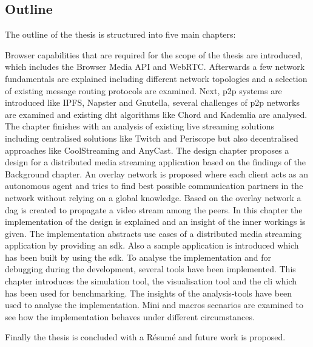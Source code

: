 \subsection{Outline}
The outline of the thesis is structured into five main chapters:
\begin{itemize}
     Browser capabilities that are required for the scope of the thesis are introduced, which includes the Browser Media API and WebRTC. Afterwards a few network fundamentals are explained including different network topologies and a selection of existing message routing protocols are examined. Next, \gls{p2p} systems are introduced like IPFS, Napster and Gnutella, several challenges of \gls{p2p} networks are examined and existing \gls{dht} algorithms like Chord and Kademlia are analysed. The chapter finishes with an analysis of existing live streaming solutions including centralised solutions like Twitch and Periscope but also decentralised approaches like CoolStreaming and AnyCast.   
     The design chapter proposes a design for a distributed media streaming application based on the findings of the Background chapter. An overlay network is proposed where each client acts as an autonomous agent and tries to find best possible communication partners in the network without relying on a global knowledge. Based on the overlay network a \gls{dag} is created to propagate a video stream among the peers.
     In this chapter the implementation of the design is explained and an insight of the inner workings is given. The implementation abstracts use cases of a distributed media streaming application by providing an \gls{sdk}. Also a sample application is introduced which has been built by using the \gls{sdk}.
     To analyse the implementation and for debugging during the development, several tools have been implemented. This chapter introduces the simulation tool, the visualisation tool and the \gls{cli} which has been used for benchmarking.
     The insights of the analysis-tools have been used to analyse the implementation. Mini and macros scenarios are examined to see how the implementation behaves under different circumstances. 
\end{itemize}
Finally the thesis is concluded with a Résumé and future work is proposed.
